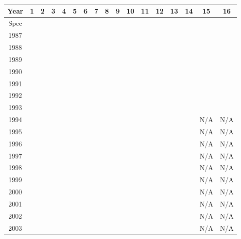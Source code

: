 \begin{center}
    \begin{tabular}{c|cccccccccccccccc}
        Year & 1 & 2 & 3 & 4 & 5 & 6 & 7 & 8 & 9 & 10 & 11 & 12  & 13  & 14  & 15  & 16  \\
        \hline
        Spec &   &   &   &   &   &   &   &   &   &    &    &     &     &     &     &     \\
        1987 &   &   &   &   &   &   &   &   &   &    &    &     &     &     &     &     \\
        1988 &   &   &   &   &   &   &   &   &   &    &    &     &     &     &     &     \\
        1989 &   &   &   &   &   &   &   &   &   &    &    &     &     &     &     &     \\
        1990 &   &   &   &   &   &   &   &   &   &    &    &     &     &     &     &     \\
        1991 &   &   &   &   &   &   &   &   &   &    &    &     &     &     &     &     \\
        1992 &   &   &   &   &   &   &   &   &   &    &    &     &     &     &     &     \\
        1993 &   &   &   &   &   &   &   &   &   &    &    &     &     &     &     &     \\
        1994 &   &   &   &   &   &   &   &   &   &    &    &     &     &     & N/A & N/A \\
        1995 &   &   &   &   &   &   &   &   &   &    &    &     &     &     & N/A & N/A \\
        1996 &   &   &   &   &   &   &   &   &   &    &    &     &     &     & N/A & N/A \\
        1997 &   &   &   &   &   &   &   &   &   &    &    &     &     &     & N/A & N/A \\
        1998 &   &   &   &   &   &   &   &   &   &    &    &     &     &     & N/A & N/A \\
        1999 &   &   &   &   &   &   &   &   &   &    &    &     &     &     & N/A & N/A \\
        2000 &   &   &   &   &   &   &   &   &   &    &    &     &     &     & N/A & N/A \\
        2001 &   &   &   &   &   &   &   &   &   &    &    &     &     &     & N/A & N/A \\
        2002 &   &   &   &   &   &   &   &   &   &    &    &     &     &     & N/A & N/A \\
        2003 &   &   &   &   &   &   &   &   &   &    &    &     &     &     & N/A & N/A \\

\end{tabular}
\end{center}
